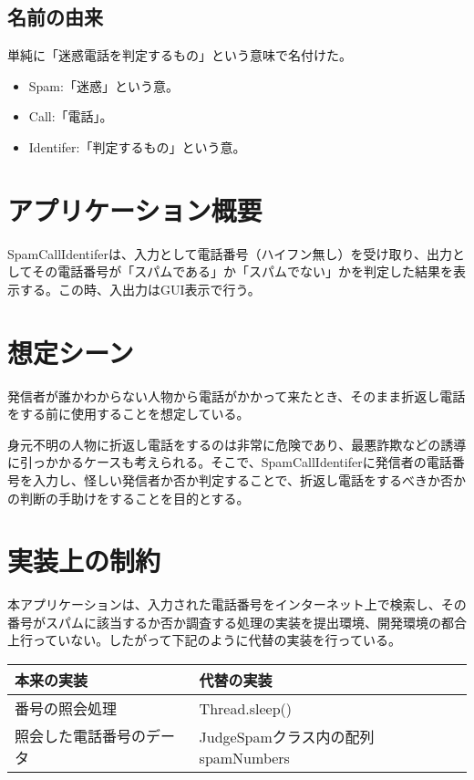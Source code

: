 \documentclass[dvipdfmx, titlepage]{jsarticle}
\begin{document}
\subsection{名前の由来}
単純に「迷惑電話を判定するもの」という意味で名付けた。
\begin{itemize}
  \item Spam:「迷惑」という意。
  \item Call:「電話」。
  \item Identifer:「判定するもの」という意。
\end{itemize}
\section{アプリケーション概要}
SpamCallIdentiferは、入力として電話番号（ハイフン無し）を受け取り、出力としてその電話番号が「スパムである」か「スパムでない」かを判定した結果を表示する。この時、入出力はGUI表示で行う。
\section{想定シーン}
発信者が誰かわからない人物から電話がかかって来たとき、そのまま折返し電話をする前に使用することを想定している。\par
身元不明の人物に折返し電話をするのは非常に危険であり、最悪詐欺などの誘導に引っかかるケースも考えられる。そこで、SpamCallIdentiferに発信者の電話番号を入力し、怪しい発信者か否か判定することで、折返し電話をするべきか否かの判断の手助けをすることを目的とする。
\section{実装上の制約}
本アプリケーションは、入力された電話番号をインターネット上で検索し、その番号がスパムに該当するか否か調査する処理の実装を提出環境、開発環境の都合上行っていない。したがって下記のように代替の実装を行っている。
\begin{table}[H]
  \begin{tabular}{|l|l|}\hline
  本来の実装        & 代替の実装                       \\\hline
  番号の照会処理      & Thread.sleep()              \\\hline
  照会した電話番号のデータ & JudgeSpamクラス内の配列spamNumbers \\ \hline
  \end{tabular}
\end{table}
\end{document}
